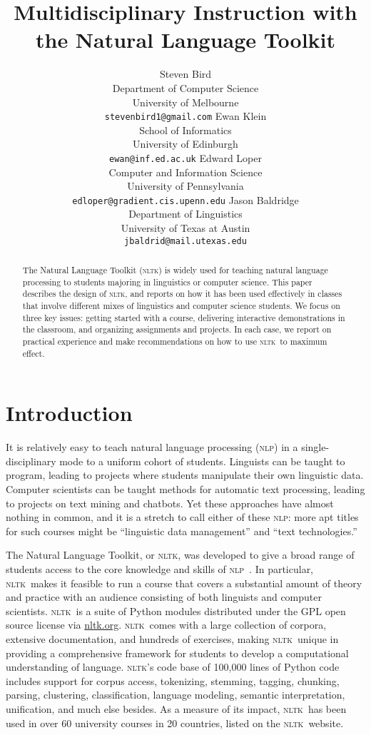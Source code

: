 \documentclass[11pt]{article}
\title{Multidisciplinary Instruction with the Natural Language Toolkit}
\author{Steven Bird \\
  Department of Computer Science\\
  University of Melbourne\\
  {\small\tt stevenbird1@gmail.com} \And
  Ewan Klein\\
  School of Informatics\\
  University of Edinburgh\\
  {\small\tt ewan@inf.ed.ac.uk} \AND
  Edward Loper\\
  Computer and Information Science\\
  University of Pennsylvania\\
  {\small\tt edloper@gradient.cis.upenn.edu} \And
  Jason Baldridge\\
  Department of Linguistics\\
  University of Texas at Austin\\
  {\small\tt jbaldrid@mail.utexas.edu}
}
\date{}
\newcommand{\NLP}{\textsc{nlp}}
\newcommand{\NLTK}{\textsc{nltk}}
\begin{document}
\maketitle

\begin{abstract}
  The Natural Language Toolkit (\NLTK) is widely used for teaching
  natural language processing to students majoring in linguistics or
  computer science.  This paper describes the design of \NLTK, and
  reports on how it has been used effectively in classes that involve
  different mixes of
  linguistics and computer science students.  We focus
  on three key issues: getting started with a course, delivering
  interactive demonstrations in the classroom,
  and organizing assignments and projects.
  In each case, we report on practical experience and make
  recommendations on how to use \NLTK\ to maximum effect.
\end{abstract}

\section{Introduction}

It is relatively easy to teach natural language processing (\NLP) in a
single-disciplinary mode to a uniform cohort of students.  Linguists
can be taught to program, leading to projects where students
manipulate their own linguistic data.  Computer scientists can be
taught methods for automatic text processing, leading to projects on
text mining and chatbots.  Yet these approaches have almost nothing in
common, and it is a stretch to call either of these \NLP: more apt
titles for such courses might be ``linguistic data management'' and
``text technologies.''

The Natural Language Toolkit, or \NLTK, was
developed to give a broad range of students access to the core
knowledge and skills of \NLP\ \cite{LoperBird02}.  In particular, \NLTK\ makes it feasible
to run a course that covers a substantial amount of theory and
practice with an audience consisting of both linguists and computer
scientists.  \NLTK\ is a suite of Python modules distributed under the
GPL open source license via \url{nltk.org}.  \NLTK\ comes with a large collection of
corpora, extensive documentation, and hundreds of exercises, making
\NLTK\ unique in providing a comprehensive framework for students to
develop a computational understanding of language.  \NLTK's code base
of 100,000 lines of Python code includes support for corpus access,
tokenizing, stemming, tagging, chunking, parsing, clustering,
classification, language modeling, semantic interpretation,
unification, and much else besides.  As a measure of its
impact, \NLTK\ has been used in over 60 university courses in 20
countries, listed on the \NLTK\ website.
\end{document}
